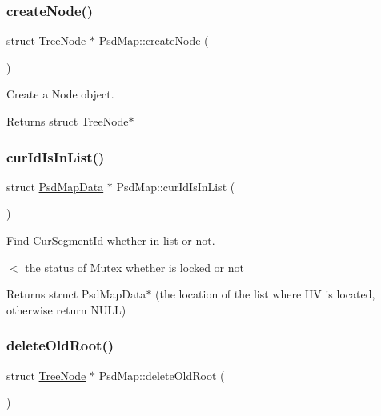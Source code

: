 \subsubsection{\texorpdfstring{create\+Node()}{createNode()}}
{\footnotesize\ttfamily struct \hyperlink{struct_tree_node}{Tree\+Node} $\ast$ Psd\+Map\+::create\+Node (\begin{DoxyParamCaption}{ }\end{DoxyParamCaption})}



Create a Node object. 

\begin{DoxyReturn}{Returns}
struct Tree\+Node$\ast$ 
\end{DoxyReturn}
\mbox{\label{class_psd_map_a5544295bf3b6f659f10a85cb30c6eef2}} 
\subsubsection{\texorpdfstring{cur\+Id\+Is\+In\+List()}{curIdIsInList()}}
{\footnotesize\ttfamily struct \hyperlink{struct_psd_map_data}{Psd\+Map\+Data} $\ast$ Psd\+Map\+::cur\+Id\+Is\+In\+List (\begin{DoxyParamCaption}{ }\end{DoxyParamCaption})}



Find Cur\+Segment\+Id whether in list or not. 

$<$ the status of Mutex whether is locked or not \begin{DoxyReturn}{Returns}
struct Psd\+Map\+Data$\ast$ (the location of the list where HV is located, otherwise return N\+U\+LL) 
\end{DoxyReturn}
\mbox{\label{class_psd_map_a2f5e7823124673a335e20ee0e9821836}} 
\subsubsection{\texorpdfstring{delete\+Old\+Root()}{deleteOldRoot()}}
{\footnotesize\ttfamily struct \hyperlink{struct_tree_node}{Tree\+Node} $\ast$ Psd\+Map\+::delete\+Old\+Root (\begin{DoxyParamCaption}{ }\end{DoxyParamCaption})}



